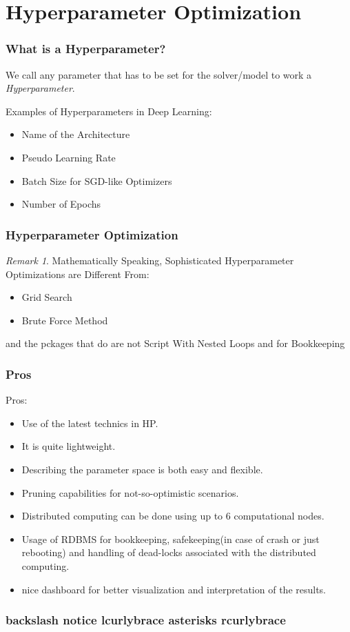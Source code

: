 \documentclass{beamer}
\theoremstyle{definition}
\theoremstyle{remark}
\newtheorem {Rem} [Thm]{Remark}
\begin{document}
\section[Hyperparameter Optimization]{Hyperparameter Optimization}

\begin{frame}
  \frametitle{What is a Hyperparameter?}
  \pause
  We call any parameter that has to be set for the solver/model to work a \emph{Hyperparameter}.
  \newline
  \newline
  
\pause  
Examples of Hyperparameters in Deep Learning:
\pause
\begin{itemize}[<+->]
  \item Name of the Architecture   
  \item Pseudo Learning Rate
  \item Batch Size for SGD-like Optimizers
  \item Number of Epochs
\end{itemize}
\end{frame}
\begin{frame}
  \frametitle{Hyperparameter Optimization}
  \begin{Rem}
    Mathematically Speaking, Sophisticated Hyperparameter Optimizations are Different From:
    \pause
    \begin{itemize}[<+->]
      \item Grid Search
      \item Brute Force Method
    \end{itemize}
    and the pckages that do \ho are not \bash Script With Nested Loops and \awk for Bookkeeping
  \end{Rem}
  
\end{frame}
\begin{frame}
  \frametitle{\optuna Pros}
  \pause
  Pros:
  \begin{itemize}[<+->]
    \item Use of the latest technics in \ac{HP}\cite{Hutter2019}\cite{Akiba2019}.
    \item It is quite lightweight.
    \item Describing the parameter space is both easy and flexible.
    \item Pruning capabilities for not-so-optimistic scenarios.
    \item Distributed computing can be done using up to 6 computational nodes.
    \item Usage of \ac{RDBMS} for bookkeeping, safekeeping(in case of crash or just rebooting) and handling of dead-locks associated with the distributed computing.
    \item nice dashboard for better visualization and interpretation of the results.  
  \end{itemize}
\end{frame}



  \begin{frame}[allowframebreaks]
  \frametitle{backslash notice lcurlybrace asterisks rcurlybrace}
  \nocite{*}
  \printbibliography 
  \end{frame}
\end{document}
